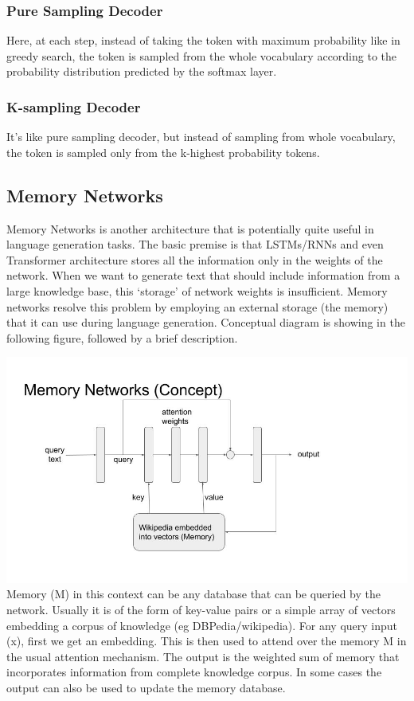 \documentclass[]{krantz}
\begin{document}
\hypertarget{pure-sampling-decoder}{%
\subsubsection{Pure Sampling Decoder}\label{pure-sampling-decoder}}

Here, at each step, instead of taking the token with maximum probability like in greedy search, the token is sampled from the whole vocabulary according to the probability distribution predicted by the softmax layer.

\hypertarget{k-sampling-decoder}{%
\subsubsection{K-sampling Decoder}\label{k-sampling-decoder}}

It's like pure sampling decoder, but instead of sampling from whole vocabulary, the token is sampled only from the k-highest probability tokens.

\hypertarget{memory-networks}{%
\subsection{Memory Networks}\label{memory-networks}}

Memory Networks is another architecture that is potentially quite useful in language generation tasks. The basic premise is that LSTMs/RNNs and even Transformer architecture stores all the information only in the weights of the network. When we want to generate text that should include information from a large knowledge base, this `storage' of network weights is insufficient. Memory networks resolve this problem by employing an external storage (the memory) that it can use during language generation. Conceptual diagram is showing in the following figure, followed by a brief description.

\includegraphics{figures/04-01-use-case1/memory_networks.jpg}
Memory (M) in this context can be any database that can be queried by the network. Usually it is of the form of key-value pairs or a simple array of vectors embedding a corpus of knowledge (eg DBPedia/wikipedia). For any query input (x), first we get an embedding. This is then used to attend over the memory M in the usual attention mechanism. The output is the weighted sum of memory that incorporates information from complete knowledge corpus. In some cases the output can also be used to update the memory database.
\end{document}
